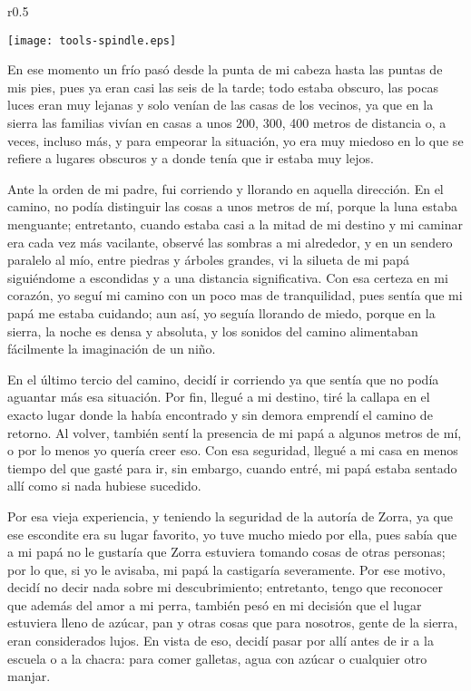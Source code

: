 \ifdefined\EnableIncludeImages
\begin{wrapfigure}{r}{0.5\textwidth}
  \begin{center}
    \texttt{[image: tools-spindle.eps]}
  \end{center}
  \vspace{-20pt}
\end{wrapfigure}
\fi
En ese momento un frío pasó desde la punta de mi cabeza hasta las puntas de mis pies, pues ya eran casi las seis de la tarde; todo estaba obscuro, las pocas luces eran muy lejanas y solo venían de las casas de los vecinos, ya que en la sierra las familias vivían en casas a unos 200, 300, 400 metros de distancia o, a veces, incluso más, y para empeorar la situación, yo era muy miedoso en lo que se refiere a lugares obscuros y a donde tenía que ir estaba muy lejos.

Ante la orden de mi padre, fui corriendo y llorando en aquella dirección. 
En el camino, no podía distinguir las cosas a unos metros de mí, porque la luna estaba menguante; 
entretanto, cuando estaba casi a la mitad de mi destino y mi caminar era cada vez más vacilante, observé las sombras a mi alrededor, y en un sendero paralelo al mío, entre piedras y árboles grandes, vi la silueta de mi papá siguiéndome a escondidas y a una distancia significativa.
Con esa certeza en mi corazón, yo seguí mi camino con un poco mas de tranquilidad, pues sentía que mi papá me estaba cuidando; 
aun así, yo seguía llorando de miedo, porque en la sierra, la noche es densa y absoluta, y los sonidos del camino alimentaban fácilmente la imaginación de un niño.

En el último tercio del camino, decidí ir corriendo ya que sentía que no podía aguantar más esa situación. Por fin, llegué a mi destino, tiré la callapa en el exacto lugar donde la había encontrado y sin demora emprendí el camino de retorno.
Al volver, también sentí la presencia de mi papá a algunos metros de mí, o por lo menos yo quería creer eso. Con esa seguridad, llegué a mi casa en menos tiempo del que gasté para ir, sin embargo, cuando entré, mi papá estaba sentado allí como si nada hubiese sucedido.

Por esa vieja experiencia, y teniendo la seguridad de la autoría de Zorra, ya que ese escondite era su lugar favorito, yo tuve mucho miedo por ella, pues sabía que a mi papá no le gustaría que Zorra estuviera tomando cosas de otras personas; por lo que, si yo le avisaba, mi papá la castigaría severamente. Por ese motivo, decidí no decir nada sobre mi descubrimiento; entretanto, tengo que reconocer que además del amor a mi perra, también pesó en mi decisión que el lugar estuviera lleno de azúcar, pan y otras cosas que para nosotros, gente de la sierra, eran considerados lujos.
En vista de eso, decidí pasar por allí antes de ir a la escuela o a la chacra: para comer galletas, agua con azúcar o cualquier otro manjar.

